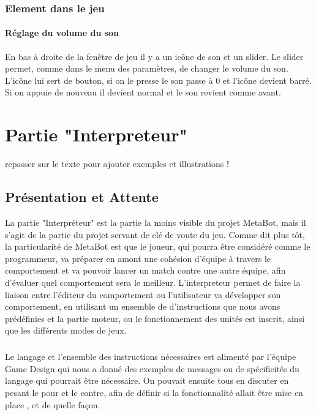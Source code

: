 \documentclass{report}
\begin{document}
\subsection{Element dans le jeu}
\subsubsection{Réglage du volume du son}
En bas à droite de la fenêtre de jeu il y a un icône de son et un slider. Le slider permet, comme dans le menu des paramètres, de changer le volume du son. L’icône lui sert de bouton, si on le presse le son passe à 0 et l’icône devient barré. Si on appuie de nouveau il devient normal et le son revient comme avant.

\newpage
\chapter{Partie "Interpreteur"}
repasser sur le texte pour ajouter exemples et illustrations ! 
\section{Présentation et Attente}
La partie "Interpréteur" est la partie la moins visible du projet MetaBot,
mais il s'agit de la partie du projet servant de clé de voute du jeu.
Comme dit plus tôt, la particularité de MetaBot est que le joueur, qui pourra être considéré comme le programmeur, va préparer en amont une cohésion d'équipe à travers le comportement et va pouvoir lancer un match contre une autre équipe, afin d'évaluer quel comportement sera le meilleur.
L'interpreteur permet de faire la liaison entre l'éditeur du comportement ou l'utilisateur va développer son comportement, en utilisant un ensemble de d'instructions que nous avons prédéfinies  et la partie moteur, ou le fonctionnement des unités est inscrit, ainsi que les différents modes de jeux.
\paragraph{}
Le langage et l'ensemble des instructions nécessaires est alimenté par l'équipe Game Design qui nous a donné des exemples de messages ou de spécificités du langage qui pourrait être nécessaire. On pouvait ensuite tous en discuter en pesant le pour et le contre, afin de définir si la fonctionnalité allait être mise en place , et de quelle façon.
\end{document}
